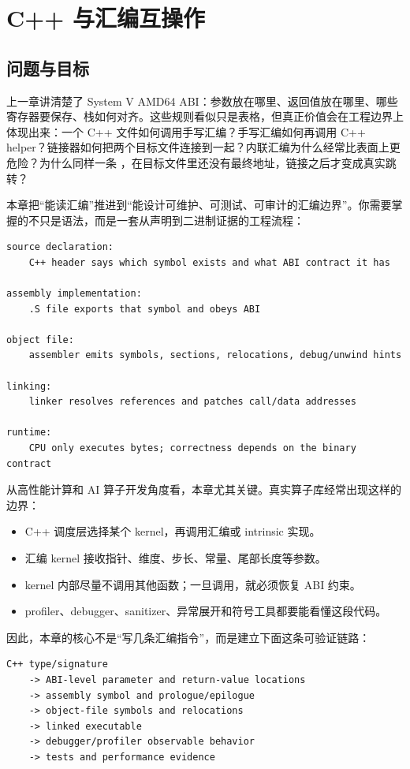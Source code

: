 \chapter{C++ 与汇编互操作}

\section{问题与目标}

上一章讲清楚了 System V AMD64 ABI：参数放在哪里、返回值放在哪里、哪些寄存器要保存、栈如何对齐。这些规则看似只是表格，但真正价值会在工程边界上体现出来：一个 C++ 文件如何调用手写汇编？手写汇编如何再调用 C++ helper？链接器如何把两个目标文件连接到一起？内联汇编为什么经常比表面上更危险？为什么同样一条 ，在目标文件里还没有最终地址，链接之后才变成真实跳转？

本章把“能读汇编”推进到“能设计可维护、可测试、可审计的汇编边界”。你需要掌握的不只是语法，而是一套从声明到二进制证据的工程流程：

\begin{lstlisting}
source declaration:
    C++ header says which symbol exists and what ABI contract it has

assembly implementation:
    .S file exports that symbol and obeys ABI

object file:
    assembler emits symbols, sections, relocations, debug/unwind hints

linking:
    linker resolves references and patches call/data addresses

runtime:
    CPU only executes bytes; correctness depends on the binary contract
\end{lstlisting}

从高性能计算和 AI 算子开发角度看，本章尤其关键。真实算子库经常出现这样的边界：

\begin{itemize}
  \item C++ 调度层选择某个 kernel，再调用汇编或 intrinsic 实现。
  \item 汇编 kernel 接收指针、维度、步长、常量、尾部长度等参数。
  \item kernel 内部尽量不调用其他函数；一旦调用，就必须恢复 ABI 约束。
  \item profiler、debugger、sanitizer、异常展开和符号工具都要能看懂这段代码。
\end{itemize}

因此，本章的核心不是“写几条汇编指令”，而是建立下面这条可验证链路：

\begin{lstlisting}
C++ type/signature
    -> ABI-level parameter and return-value locations
    -> assembly symbol and prologue/epilogue
    -> object-file symbols and relocations
    -> linked executable
    -> debugger/profiler observable behavior
    -> tests and performance evidence
\end{lstlisting}

